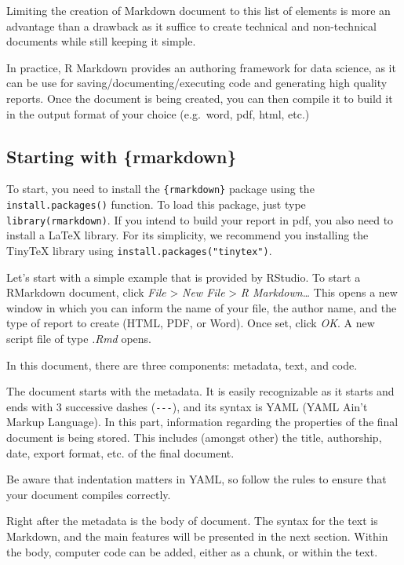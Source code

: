 \documentclass[
]{krantz}
\begin{document}
Limiting the creation of Markdown document to this list of elements is more an advantage than a drawback as it suffice to create technical and non-technical documents while still keeping it simple.

In practice, R Markdown provides an authoring framework for data science, as it can be use for saving/documenting/executing code and generating high quality reports. Once the document is being created, you can then compile it to build it in the output format of your choice (e.g.~word, pdf, html, etc.)

\hypertarget{starting-with-rmarkdown}{%
\subsection{Starting with \{rmarkdown\}}\label{starting-with-rmarkdown}}

To start, you need to install the \texttt{\{rmarkdown\}} package using the \texttt{install.packages()} function. To load this package, just type \texttt{library(rmarkdown)}. If you intend to build your report in pdf, you also need to install a LaTeX library. For its simplicity, we recommend you installing the TinyTeX library using \texttt{install.packages("tinytex")}.

Let's start with a simple example that is provided by RStudio. To start a RMarkdown document, click \emph{File} \textgreater{} \emph{New File} \textgreater{} \emph{R Markdown\ldots{}} This opens a new window in which you can inform the name of your file, the author name, and the type of report to create (HTML, PDF, or Word). Once set, click \emph{OK}. A new script file of type \emph{.Rmd} opens.

In this document, there are three components: metadata, text, and code.

The document starts with the metadata. It is easily recognizable as it starts and ends with 3 successive dashes (\texttt{-\/-\/-}), and its syntax is YAML (YAML Ain't Markup Language). In this part, information regarding the properties of the final document is being stored. This includes (amongst other) the title, authorship, date, export format, etc. of the final document.

Be aware that indentation matters in YAML, so follow the rules to ensure that your document compiles correctly.

Right after the metadata is the body of document. The syntax for the text is Markdown, and the main features will be presented in the next section. Within the body, computer code can be added, either as a chunk, or within the text.
\end{document}
